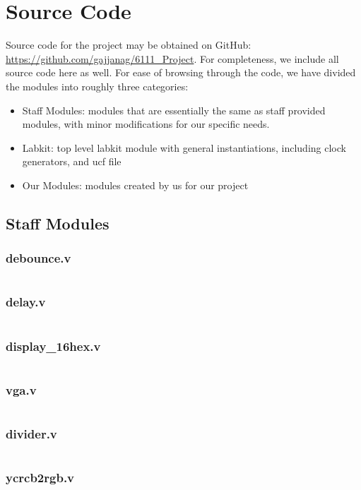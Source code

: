 \documentclass{article}
\begin{document}
\section{Source Code}
Source code for the project may be obtained on GitHub: \url{https://github.com/gajjanag/6111_Project}.
For completeness, we include all source code here as well.
For ease of browsing through the code, we have divided the modules into roughly three categories:
\begin{itemize}
\item Staff Modules: modules that are essentially the same as staff provided modules, with minor modifications for our specific needs.
\item Labkit: top level labkit module with general instantiations, including clock generators, and ucf file
\item Our Modules: modules created by us for our project
\end{itemize}

\subsection{Staff Modules}
\subsubsection{debounce.v}
\inputminted[linenos]{verilog}{../../src/debounce.v}
\subsubsection{delay.v}
\inputminted[linenos]{verilog}{../../src/delay.v}
\subsubsection{display\_16hex.v}
\inputminted[linenos]{verilog}{../../src/display_16hex.v}
\subsubsection{vga.v}
\inputminted[linenos]{verilog}{../../src/vga.v}
\subsubsection{divider.v}
\inputminted[linenos]{verilog}{../../src/divider.v}
\subsubsection{ycrcb2rgb.v}
\inputminted[linenos]{verilog}{../../src/ycrcb2rgb.v}
\end{document}
